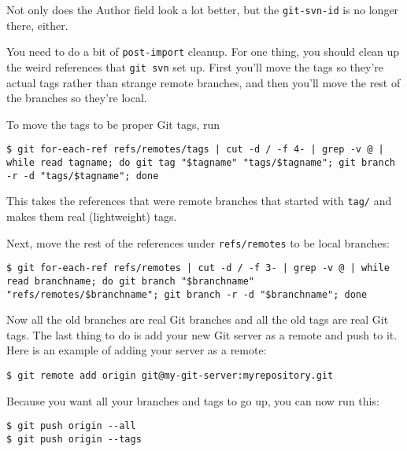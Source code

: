 \documentclass[a4paper]{book}
\begin{document}
Not only does the Author field look a lot better, but the \texttt{git-svn-id} is no longer there, either.

You need to do a bit of \texttt{post-import} cleanup. For one thing, you should clean up the weird references that \texttt{git svn} set up. First you'll move the tags so they're actual tags rather than strange remote branches, and then you'll move the rest of the branches so they're local.

To move the tags to be proper Git tags, run

\begin{shaded}\begin{verbatim}
$ git for-each-ref refs/remotes/tags | cut -d / -f 4- | grep -v @ | while read tagname; do git tag "$tagname" "tags/$tagname"; git branch -r -d "tags/$tagname"; done
\end{verbatim}\end{shaded}

This takes the references that were remote branches that started with \texttt{tag/} and makes them real (lightweight) tags.

Next, move the rest of the references under \texttt{refs/remotes} to be local branches:

\begin{shaded}\begin{verbatim}
$ git for-each-ref refs/remotes | cut -d / -f 3- | grep -v @ | while read branchname; do git branch "$branchname" "refs/remotes/$branchname"; git branch -r -d "$branchname"; done
\end{verbatim}\end{shaded}

Now all the old branches are real Git branches and all the old tags are real Git tags. The last thing to do is add your new Git server as a remote and push to it. Here is an example of adding your server as a remote:

\begin{shaded}\begin{verbatim}
$ git remote add origin git@my-git-server:myrepository.git
\end{verbatim}\end{shaded}

Because you want all your branches and tags to go up, you can now run this:

\begin{shaded}\begin{verbatim}
$ git push origin --all
$ git push origin --tags
\end{verbatim}\end{shaded}
\end{document}
